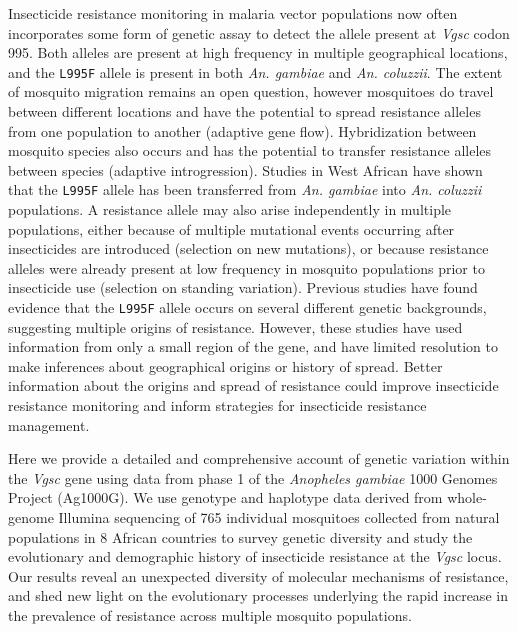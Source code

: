 \documentclass[a4paper,11pt,abstracton]{scrartcl}
\begin{document}
%
Insecticide resistance monitoring in malaria vector populations now often incorporates some form of genetic assay to detect the allele present at \emph{Vgsc} codon 995.
%
Both alleles are present at high frequency in multiple geographical locations, and the \texttt{L995F} allele is present in both \emph{An. gambiae} and \emph{An. coluzzii}.
%
The extent of mosquito migration remains an open question, however mosquitoes do travel between different locations and have the potential to spread resistance alleles from one population to another (adaptive gene flow).
%
Hybridization between mosquito species also occurs and has the potential to transfer resistance alleles between species (adaptive introgression).
%
Studies in West African have shown that the \texttt{L995F} allele has been transferred from \emph{An. gambiae} into \emph{An. coluzzii} populations.
%
A resistance allele may also arise independently in multiple populations, either because of multiple mutational events occurring after insecticides are introduced (selection on new mutations), or because resistance alleles were already present at low frequency in mosquito populations prior to insecticide use (selection on standing variation).
%
Previous studies have found evidence that the \texttt{L995F} allele occurs on several different genetic backgrounds, suggesting multiple origins of resistance.
%
However, these studies have used information from only a small region of the gene, and have limited resolution to make inferences about geographical origins or history of spread.
%
Better information about the origins and spread of resistance could improve insecticide resistance monitoring and inform strategies for insecticide resistance management.


%
Here we provide a detailed and comprehensive account of genetic variation within the \emph{Vgsc} gene using data from phase 1 of the \emph{Anopheles gambiae} 1000 Genomes Project (Ag1000G).
%
We use genotype and haplotype data derived from whole-genome Illumina sequencing of 765 individual mosquitoes collected from natural populations in 8 African countries to survey genetic diversity and study the evolutionary and demographic history of insecticide resistance at the \emph{Vgsc} locus.
%
Our results reveal an unexpected diversity of molecular mechanisms of resistance, and shed new light on the evolutionary processes underlying the rapid increase in the prevalence of resistance across multiple mosquito populations.
\end{document}

